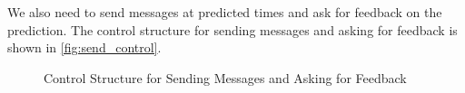 We also need to send messages at predicted times and ask for feedback on the prediction.
The control structure for sending messages and asking for feedback is shown in \autoref{fig:send_control}.

\begin{figure}[htbp]
  \centering
  \caption[Control Structure for Sending Messages and Asking for Feedback]{Control Structure for Sending Messages and Asking for Feedback}
  \label{fig:send_control}
\end{figure}


